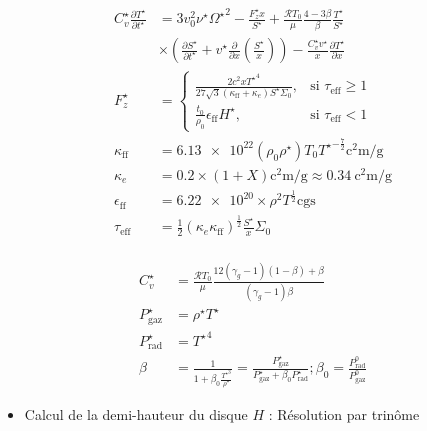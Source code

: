 \begin{frame}
	\begin{equation*}
    \begin{aligned}
    C_v^\star \frac{\partial T^{\star}}{\partial t^{\star}} &=
        3 v_0^2 \nu^\star {\Omega^\star}^2 - \frac{F_z^\star x}{S^\star} +
        \frac{\mathcal{R} T_0}{\mu} \frac{4-3\beta}{\beta} \frac{T^\star}{S^\star} \\
        & \times
        \left( \frac{\partial S^\star}{\partial t^\star} + v^\star \frac{\partial}{\partial x} \left(\frac{S^\star}{x}\right) \right) -
        \frac{C_v^\star v^\star}{x} \frac{\partial T^\star}{\partial x}\\
        F_z^\star &=
        \begin{cases}
            \frac{2 c^2 x {T^\star}^4}{27 \sqrt{3} (\kappa_\mathrm{ff} + \kappa_e) S^\star \Sigma_0}, &\text{si $\tau_\mathrm{eff} \geq 1$} \\
            \frac{t_0}{\rho_0}\epsilon_\mathrm{ff} H^\star, &\text{si $\tau_\mathrm{eff} < 1$}
        \end{cases} \\
        \kappa_\mathrm{ff} &= \num{6.13e22} (\rho_0 \rho^\star) {T_0 T^\star}^{-\frac{7}{2}} \si{\square\centi\meter\per\gram} \\
        \kappa_e &= 0.2 \times (1 + X) \si{\square\centi\meter\per\gram} \approx \SI{0.34}{\square\centi\meter\per\gram} \\
        \epsilon_\mathrm{ff} &= \num{6.22e20} \times \rho^2 T^\frac{1}{2} \mathrm{cgs} \\
        \tau_\mathrm{eff} &= \frac{1}{2} (\kappa_e \kappa_\mathrm{ff})^\frac{1}{2} \frac{S^\star}{x} \Sigma_0 \\
    \end{aligned}
\end{equation*}
\end{frame} 

\begin{frame}
	\begin{equation*}
    \begin{aligned}
     C_v^\star &= \frac{\mathcal{R} T_0}{\mu} \frac{12 (\gamma_g - 1)(1 - \beta) + \beta}{(\gamma_g - 1) \beta} \\
        P_\mathrm{gaz}^\star &= \rho^\star T^\star \\
        P_\mathrm{rad}^\star &= {T^\star}^4 \\
        \beta &= \frac{1}{1 + \beta_0 \frac{{T^\star}^3}{\rho^\star}} = \frac{P_\mathrm{gaz}^\star}{P_\mathrm{gaz}^\star + \beta_0 P_\mathrm{rad}^\star} ; \beta_0 = \frac{P_\mathrm{rad}^0}{P_\mathrm{gaz}^0}
    \end{aligned}
\end{equation*}

	\begin{itemize}
		\item Calcul de la demi-hauteur du disque $H$ : Résolution par trinôme
	\end{itemize}
	
\end{frame} 
